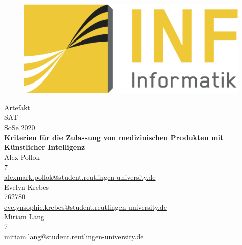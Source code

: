 \begin{titlepage}
    \begin{figure}
        \begin{flushright}
            \includegraphics[scale=0.75]{images/INFLogo.png}
        \end{flushright}
    \end{figure}

    \centering
    \vspace{1.5cm}
    {\Large Artefakt}\\

    \vspace{0.5cm}
    {\Large SAT}\\
    {\Large SoSe 2020}\\

    \vspace{1.0cm}
    \Large{\textbf{
            Kriterien für die Zulassung von medizinischen Produkten mit Künstlicher Intelligenz
          }
    }\\

    \vspace{1.0cm}
    {\small Alex Pollok}\\
    {\small 7}\\
    {\small \href{mailto:alex_mark.pollok@student.reutlingen-university.de}{alex{\textunderscore}mark.pollok@student.reutlingen-university.de}}\\
    \vspace{0,5cm}
    {\small Evelyn Krebes}\\
    {\small 762780}\\
    {\small \href{mailto:evelyn_sophie.krebes@student.reutlingen-university.de}{evelyn{\textunderscore}sophie.krebes@student.reutlingen-university.de}}\\
    \vspace{0,5cm}
    {\small Miriam Lang}\\
    {\small 7}\\
    {\small \href{mailto:miriam.lang@student.reutlingen-university.de}{miriam.lang@student.reutlingen-university.de}}\\


\end{titlepage}

